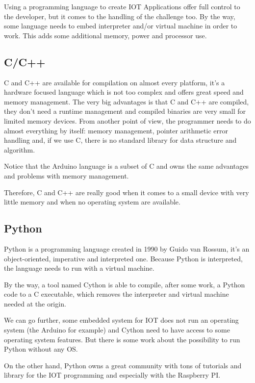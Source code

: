 Using a programming language to create IOT Applications offer full control to
the developer, but it comes to the handling of the challenge too. By the way, some
language needs to embed interpreter and/or virtual machine in order to work. This
adds some additional memory, power and processor use.

\subsection{C/C++}
\label{subsec:cc++}

C and C++ are available for compilation on almost every platform, it’s a
hardware focused language which is not too complex and offers great speed and
memory management. The very big advantages is that C and C++ are compiled, they
don’t need a runtime management and compiled binaries are very small for limited
memory devices. From another point of view, the programmer needs to do almost
everything by itself: memory management, pointer arithmetic error handling
and, if we use C, there is no standard library for data structure and algorithm.

Notice that the Arduino language is a subset of C and owns the same advantages
and problems with memory management.

Therefore, C and C++ are really good when it comes to a small device with very
little memory and when no operating system are available.

\subsection{Python}
\label{subsec:python}

Python is a programming language created in 1990 by Guido van Rossum, it’s an
object-oriented, imperative and interpreted one. Because Python is interpreted,
the language needs to run with a virtual machine.

By the way, a tool named Cython\cite{behnel2010cython} is able to compile, after
some work, a Python code to a C executable, which removes the interpreter and
virtual machine needed at the origin.

We can go further, some embedded system for IOT does not run an operating system
(the Arduino for example) and Cython need to have access to some operating
system features. But there is some work about the possibility to run Python
without any OS\cite{jakeedge2015}.

On the other hand, Python owns a great community with tons of tutorials and library
for the IOT programming and especially with the Raspberry PI.


